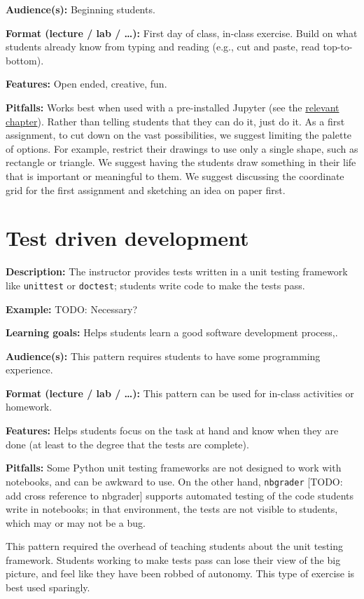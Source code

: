 \documentclass[]{book}
\begin{document}
\textbf{Audience(s):} Beginning students.

\textbf{Format (lecture / lab / \ldots{}):} First day of class, in-class
exercise. Build on what students already know from typing and reading
(e.g., cut and paste, read top-to-bottom).

\textbf{Features:} Open ended, creative, fun.

\textbf{Pitfalls:} Works best when used with a pre-installed Jupyter
(see the \protect\hyperlink{jupyter}{relevant chapter}). Rather than
telling students that they can do it, just do it. As a first assignment,
to cut down on the vast possibilities, we suggest limiting the palette
of options. For example, restrict their drawings to use only a single
shape, such as rectangle or triangle. We suggest having the students
draw something in their life that is important or meaningful to them. We
suggest discussing the coordinate grid for the first assignment and
sketching an idea on paper first.

\section{Test driven development}\label{test-driven-development}

\textbf{Description:} The instructor provides tests written in a unit
testing framework like \texttt{unittest} or \texttt{doctest}; students
write code to make the tests pass.

\textbf{Example:} TODO: Necessary?

\textbf{Learning goals:} Helps students learn a good software
development process,.

\textbf{Audience(s):} This pattern requires students to have some
programming experience.

\textbf{Format (lecture / lab / \ldots{}):} This pattern can be used for
in-class activities or homework.

\textbf{Features:} Helps students focus on the task at hand and know
when they are done (at least to the degree that the tests are complete).

\textbf{Pitfalls:} Some Python unit testing frameworks are not designed
to work with notebooks, and can be awkward to use. On the other hand,
\texttt{nbgrader} {[}TODO: add cross reference to nbgrader{]} supports
automated testing of the code students write in notebooks; in that
environment, the tests are not visible to students, which may or may not
be a bug.

This pattern required the overhead of teaching students about the unit
testing framework. Students working to make tests pass can lose their
view of the big picture, and feel like they have been robbed of
autonomy. This type of exercise is best used sparingly.
\end{document}
